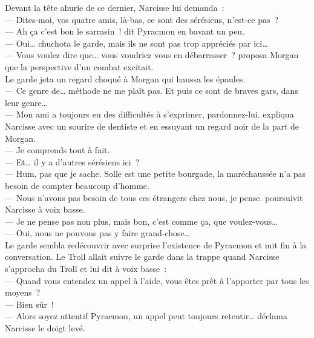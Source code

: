 \documentclass[french, a4paper, 12pt]{article}
\begin{document}
Devant la tête ahurie de ce dernier, Narcisse lui demanda~:\\
--- Dites-moi, vos quatre amis, là-bas, ce sont des sérésiens, n'est-ce pas~?\\
--- Ah ça c'est bon le sarrasin~! dit Pyracmon en bavant un peu.\\
--- Oui… chuchota le garde, mais ils ne sont pas trop appréciés par ici…\\
--- Vous voulez dire que… vous voudriez vous en débarrasser~? proposa Morgan que la perspective d'un combat excitait.\\
Le garde jeta un regard choqué à Morgan qui haussa les épaules.\\
--- Ce genre de… méthode ne me plaît pas. Et puis ce sont de braves gars, dans leur genre…\\
--- Mon ami a toujours eu des difficultés à s'exprimer, pardonnez-lui. expliqua Narcisse avec un sourire de dentiste et en essuyant un regard noir de la part de Morgan.\\
--- Je comprends tout à fait.\\
--- Et… il y a d'autres sérésiens ici~?\\
--- Hum, pas que je sache. Solle est une petite bourgade, la maréchaussée n'a pas besoin de compter beaucoup d'homme.\\
--- Nous n'avons pas besoin de tous ces étrangers chez nous, je pense. poursuivit Narcisse à voix basse.\\
--- Je ne pense pas non plus, mais bon, c'est comme ça, que voulez-vous…\\
--- Oui, nous ne pouvons pas y faire grand-chose…\\
Le garde sembla redécouvrir avec surprise l'existence de Pyracmon et mit fin à la conversation. Le Troll allait suivre le garde dans la trappe quand Narcisse s'approcha du Troll et lui dit à voix basse~:\\
--- Quand vous entendez un appel à l'aide, vous êtes prêt à l'apporter par tous les moyens~?\\
--- Bien sûr~!\\
--- Alors soyez attentif Pyracmon, un appel peut toujours retentir… déclama Narcisse le doigt levé.\\
\end{document}
